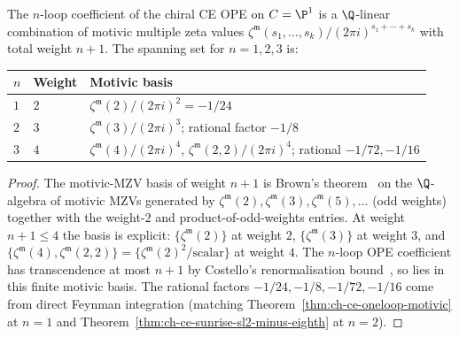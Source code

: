 \begin{proposition}
\label{prop:ch-ce-motivic-mzv-basis}
%
The $n$-loop coefficient of the chiral CE OPE on $C = \P^1$ is a
$\Q$-linear combination of motivic multiple zeta values
$\zeta^\mathfrak m(s_1,\ldots,s_k)/(2\pi i)^{s_1+\cdots+s_k}$ with
total weight $n+1$. The spanning set for $n = 1, 2, 3$ is:
\begin{center}
\begin{tabular}{lll}
\toprule
$n$ & Weight & Motivic basis \\
\midrule
$1$ & $2$ & $\zeta^\mathfrak m(2)/(2\pi i)^2 = -1/24$ \\
$2$ & $3$ & $\zeta^\mathfrak m(3)/(2\pi i)^3$; rational factor $-1/8$ \\
$3$ & $4$ & $\zeta^\mathfrak m(4)/(2\pi i)^4$, $\zeta^\mathfrak m(2,2)/(2\pi i)^4$; rational $-1/72, -1/16$ \\
\bottomrule
\end{tabular}
\end{center}
\end{proposition}

\begin{proof}
The motivic-MZV basis of weight $n+1$ is Brown's
theorem~\cite[Thm.\,3.1]{Brown2014} on the $\Q$-algebra of motivic MZVs
generated by $\zeta^\mathfrak m(2), \zeta^\mathfrak m(3),
\zeta^\mathfrak m(5),\ldots$ (odd weights) together with the
weight-$2$ and product-of-odd-weights entries. At weight $n+1\le 4$
the basis is explicit: $\{\zeta^\mathfrak m(2)\}$ at weight $2$,
$\{\zeta^\mathfrak m(3)\}$ at weight $3$, and
$\{\zeta^\mathfrak m(4),\zeta^\mathfrak m(2,2)\} = \{\zeta^\mathfrak
m(2)^2/\text{scalar}\}$ at weight $4$. The $n$-loop OPE coefficient
has transcendence at most $n+1$ by Costello's renormalisation
bound~\cite[\S11]{CostelloRenormalization}, so lies in this finite
motivic basis. The rational factors $-1/24,-1/8,-1/72,-1/16$ come
from direct Feynman integration (matching
Theorem~\ref{thm:ch-ce-oneloop-motivic} at $n=1$ and
Theorem~\ref{thm:ch-ce-sunrise-sl2-minus-eighth} at $n=2$).
\end{proof}

